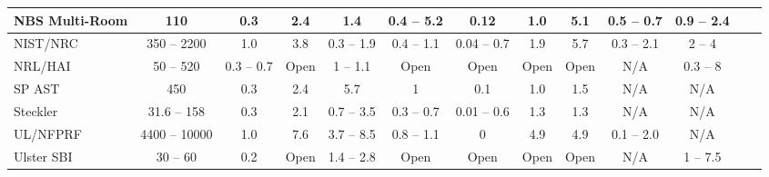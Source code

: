 \begin{sidewaystable}[p]
\begin{center}
\begin{tabular}{|l|c|c|c|c|c|c|c|c|c|c|c|c|}
NBS Multi-Room      & 110           & 0.3           & 2.4   & 1.4               & 0.4 -- 5.2    & 0.12          & 1.0       & 5.1       & 0.5 -- 0.7        & 0.9 -- 2.4        \\ \hline
NIST/NRC            & 350 -- 2200   & 1.0           & 3.8   & 0.3 -- 1.9        & 0.4 -- 1.1    & 0.04 -- 0.7   & 1.9       & 5.7       & 0.3 -- 2.1        & 2 -- 4            \\ \hline
NRL/HAI             & 50 -- 520     & 0.3 -- 0.7    & Open  & 1 -- 1.1          & Open          & Open          & Open      & Open      & N/A               & 0.3 -- 8          \\ \hline
SP AST              & 450           & 0.3           & 2.4   & 5.7               & 1             & 0.1           & 1.0       & 1.5       & N/A               & N/A               \\ \hline
Steckler            & 31.6 -- 158   & 0.3           & 2.1   & 0.7 -- 3.5        & 0.3 -- 0.7    & 0.01 -- 0.6   & 1.3       & 1.3       & N/A               & N/A               \\ \hline
UL/NFPRF            & 4400 -- 10000 & 1.0           & 7.6   & 3.7 -- 8.5        & 0.8 -- 1.1    & 0             & 4.9       & 4.9       & 0.1 -- 2.0        & N/A               \\ \hline
Ulster SBI          & 30 -- 60      & 0.2           & Open  & 1.4 -- 2.8        & Open          & Open          & Open      & Open      & N/A               & 1 -- 7.5          \\ \hline

\end{tabular}
\end{center}
\end{sidewaystable}
